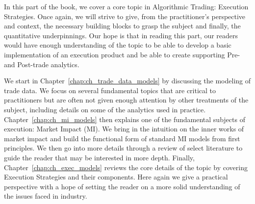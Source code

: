 
In this part of the book, we cover a core topic in Algorithmic Trading: Execution Strategies. Once again, we will strive to give, from the practitioner's perspective and context, the necessary building blocks to grasp the subject and finally, the quantitative underpinnings. Our hope is that in reading this part, our readers would have enough understanding of the topic to be able to develop a basic implementation of an execution product and be able to create supporting Pre- and Post-trade analytics.


We start in Chapter~\ref{chap:ch_trade_data_models} by discussing the modeling of trade data. We focus on several fundamental topics that are critical to practitioners but are often not given enough attention by other treatments of the subject, including details on some of the analytics used in practice. Chapter~\ref{chap:ch_mi_models} then explains one of the fundamental subjects of execution: Market Impact (MI). We bring in the intuition on the inner works of market impact and build the functional form of standard MI models from first principles. We then go into more details through a review of select literature to guide the reader that may be interested in more depth. Finally, Chapter~\ref{chap:ch_exec_models} reviews the core details of the topic by covering Execution Strategies and their components. Here again we give a practical perspective with a hope of setting the reader on a more solid understanding of the issues faced in industry.